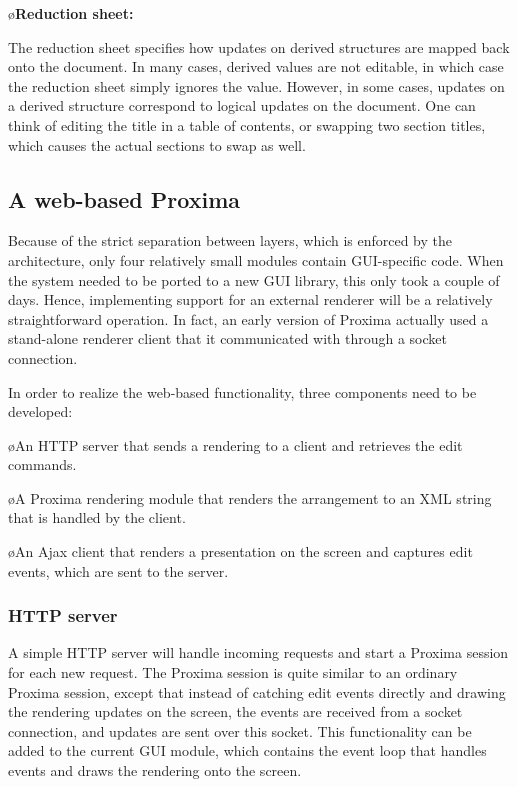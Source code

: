 \documentclass[10pt]{article}
\begin{document}
\o{\bf Reduction sheet:}

The reduction sheet specifies how updates on derived structures are mapped back onto the document. In many cases, derived values are not editable, in which case the reduction sheet simply ignores the value. However, in some cases, updates on a derived structure correspond to logical updates on the document. One can think of editing the title in a table of contents, or swapping two section titles, which causes the actual sections to swap as well. 
\el


\subsection{A web-based Proxima}


Because of the strict separation between layers, which is enforced by the architecture, 
only four relatively small modules contain GUI-specific code. When the system needed to be ported to a new GUI library, this only took a couple of days. Hence, implementing support for an external renderer will be a relatively straightforward operation. In fact, an early version of Proxima actually used a stand-alone renderer client that it communicated with through a socket connection.

In order to realize the web-based functionality, three components need to be developed:

\bl
\o An HTTP server that sends a rendering to a client and retrieves the edit commands. 

\o A Proxima rendering module that renders the arrangement to an XML string that is handled by the client.

\o An Ajax client that renders a presentation on the screen and captures edit events, which are sent to the server.
\el

\subsubsection{HTTP server}

A simple HTTP server will handle incoming requests and start a Proxima session for each new request. The Proxima session is quite similar to an ordinary Proxima session, except that instead of catching edit events directly and drawing the rendering updates on the screen, the events are received from a socket connection, and updates are sent over  this socket. This functionality can be added to the current GUI module, which contains the event loop that handles events and draws the rendering onto the screen. 
 
\end{document}
